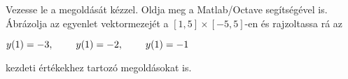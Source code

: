Vezesse le a 
\de{} megoldását kézzel. 
Oldja meg a Matlab/Octave   segítségével is. 
Ábrázolja az egyenlet vektormezejét a $[1,5]\times [-5,5]$-en és rajzoltassa rá 
az 
\centerline{$y(1)=-3, \hspace{0.8cm} y(1)=-2, \hspace{0.8cm} y(1)=-1$} 
kezdeti értékekhez tartozó megoldásokat is.



